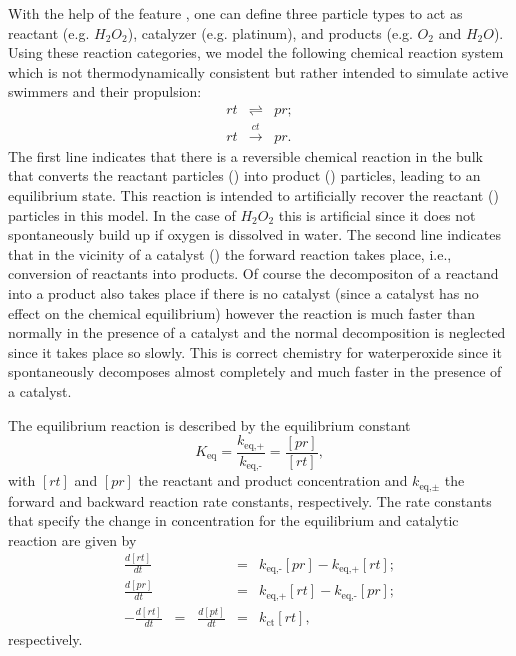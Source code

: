 With the help of the feature , one can
define three particle types to act as reactant (e.g. $H_2O_2$), catalyzer (e.g. platinum), and
products (e.g. $O_2$ and $H_2O$). Using these reaction categories, we model the following
chemical reaction system which is not thermodynamically consistent but rather intended to simulate active swimmers and their propulsion:
\begin{eqnarray}
rt & \rightleftharpoons & pr ; \\
rt & \xrightarrow{ct} & pr.
\end{eqnarray}
The first line indicates that there is a reversible chemical
reaction in the bulk that converts the reactant particles () into product
() particles, leading to an equilibrium state. This reaction is intended to artificially recover the reactant () particles in this model. In the case of $H_2O_2$ this is artificial since it does not spontaneously build up if oxygen is dissolved in water. The second line
indicates that in the vicinity of a catalyst () the forward
reaction takes place, i.e., conversion of reactants into
products. Of course the decompositon of a reactand into a product also takes place if there is no catalyst (since a catalyst has no effect on the chemical equilibrium) however the reaction is much faster than normally in the presence of a catalyst and the normal decomposition is neglected since it takes place so slowly. This is correct chemistry for waterperoxide since it spontaneously decomposes almost completely and much faster in the presence of a catalyst.

The equilibrium reaction is described by the equilibrium
constant
\begin{equation}
K_{\text{eq}} = \frac{k_{\text{eq,+}}}{k_{\text{eq,-}}} = \frac{[pr]}{[rt]},
\end{equation}
with $[rt]$ and $[pr]$ the reactant and product concentration and
$k_{\text{eq,$\pm$}}$ the forward and backward reaction rate
constants, respectively. The rate constants that specify the change in
concentration for the equilibrium and catalytic reaction are given by
\begin{eqnarray}
\frac{d[rt]}{dt} & = & k_{\text{eq,-}}[pr] - k_{\text{eq,+}}[rt] ; \\
\frac{d[pr]}{dt} & = & k_{\text{eq,+}}[rt] - k_{\text{eq,-}}[pr] ; \\
-\frac{d[rt]}{dt} \;\; = \;\; \frac{d[pt]}{dt} & = & k_{\text{ct}}[rt] ,
\end{eqnarray}
respectively.

